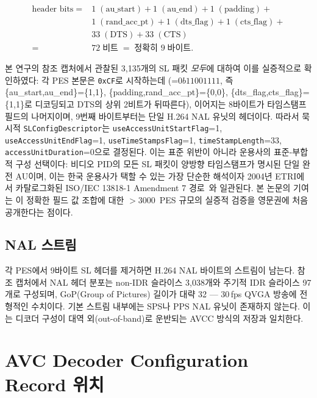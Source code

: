 \documentclass[11pt,a4paper]{article}
\begin{document}
\begin{align*}
\text{header bits} \;=\; & 1 \;(\text{au\_start}) + 1 \;(\text{au\_end}) + 1 \;(\text{padding}) + \\
                         & 1 \;(\text{rand\_acc\_pt}) + 1 \;(\text{dts\_flag}) + 1 \;(\text{cts\_flag}) + \\
                         & 33 \;(\text{DTS}) + 33 \;(\text{CTS}) \\
                       =\; & 72 \; \text{비트} \;=\; \text{정확히 } 9 \;\text{바이트}.
\end{align*}

본 연구의 참조 캡처에서 관찰된 3{,}135개의 SL 패킷 \emph{모두}에 대하여
이를 실증적으로 확인하였다: 각 PES 본문은 \texttt{0xCF}로 시작하는데
(=$0b11001111$, 즉 \{au\_start,au\_end\}=\{1,1\},
\{padding,rand\_acc\_pt\}=\{0,0\}, \{dts\_flag,cts\_flag\}=\{1,1\}로
디코딩되고 DTS의 상위 2비트가 뒤따른다), 이어지는 8바이트가 타임스탬프
필드의 나머지이며, 9번째 바이트부터는 단일 H.264 NAL 유닛의 헤더이다.
따라서 묵시적 \texttt{SLConfigDescriptor}는
\texttt{useAccessUnitStartFlag}=1, \texttt{useAccessUnitEndFlag}=1,
\texttt{useTimeStampsFlag}=1, \texttt{timeStampLength}=33,
\texttt{accessUnitDuration}=0으로 결정된다.  이는 표준 위반이
아니라 운용사의 표준-부합적 구성 선택이다: 비디오 PID의 모든 SL 패킷이
양방향 타임스탬프가 명시된 단일 완전 AU이며, 이는 한국 운용사가 택할
수 있는 가장 단순한 해석이자 2004년 ETRI에서 카탈로그화된 ISO/IEC
13818-1 Amendment 7 경로~\cite{lee2004m4smux}와 일관된다.  본 논문의
기여는 이 정확한 필드 값 조합에 대한 ${>}3000$~PES 규모의 실증적
검증을 영문권에 처음 공개한다는 점이다.

\subsection{NAL 스트림}

각 PES에서 9바이트 SL 헤더를 제거하면 H.264 NAL 바이트의 스트림이 남는다.
참조 캡처에서 NAL 헤더 분포는 non-IDR 슬라이스 3{,}038개와 주기적
IDR 슬라이스 97개로 구성되며, GoP(Group of Pictures) 길이가 대략 32 ---
30\,fps QVGA 방송에 전형적인 수치이다.  기본 스트림 내부에는 SPS나
PPS NAL 유닛이 존재하지 않는다.  이는 디코더 구성이 대역 외(out-of-band)로
운반되는 AVCC 방식의 저장과 일치한다.

\section{AVC Decoder Configuration Record 위치}\label{sec:avcc}
\end{document}
